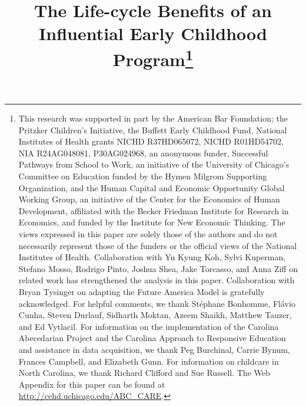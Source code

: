 


\newcommand*\leftright[2]{%
  \leavevmode
  \rlap{#1}%
  \hspace{0.5\linewidth}%
  #2}

\newcommand{\orth}{\ensuremath{\perp\!\!\!\perp}}%
\newcommand{\indep}{\orth}%
\newcommand{\notorth}{\ensuremath{\perp\!\!\!\!\!\!\diagup\!\!\!\!\!\!\perp}}%
\newcommand{\notindep}{\notorth}





\begin{titlepage}

\title{\Large \textbf{The Life-cycle Benefits of an Influential Early Childhood Program}\thanks{This research was supported in part by the American Bar Foundation; the Pritzker Children's Initiative, the Buffett Early Childhood Fund, National Institutes of Health grants NICHD R37HD065072, NICHD R01HD54702, NIA R24AG048081, P30AG024968, an anonymous funder, Successful Pathways from School to Work, an initiative of the University of Chicago's Committee on Education funded by the Hymen Milgrom Supporting Organization, and the Human Capital and Economic Opportunity Global Working Group, an initiative of the Center for the Economics of Human Development, affiliated with the Becker Friedman Institute for Research in Economics, and funded by the Institute for New Economic Thinking. The views expressed in this paper are solely those of the authors and do not necessarily represent those of the funders or the official views of the National Institutes of Health. Collaboration with Yu Kyung Koh, Sylvi Kuperman, Stefano Mosso, Rodrigo Pinto, Joshua Shea, Jake Torcasso, and Anna Ziff on related work has strengthened the analysis in this paper. Collaboration with Bryan Tysinger on adapting the Future America Model is gratefully acknowledged. For helpful comments, we thank St\'{e}phane Bonhomme, Fl\'{a}vio Cunha, Steven Durlauf, Sidharth Moktan, Azeem Shaikh, Matthew Tauzer, and Ed Vytlacil. For information on the implementation of the Carolina Abecedarian Project and the Carolina Approach to Responsive Education and assistance in data acquisition, we thank Peg Burchinal, Carrie Bynum, Frances Campbell, and Elizabeth Gunn. For information on childcare in North Carolina, we thank Richard Clifford and Sue Russell. The Web Appendix for this paper can be found at \url{http://cehd.uchicago.edu/ABC_CARE}.}}


\end{titlepage}
